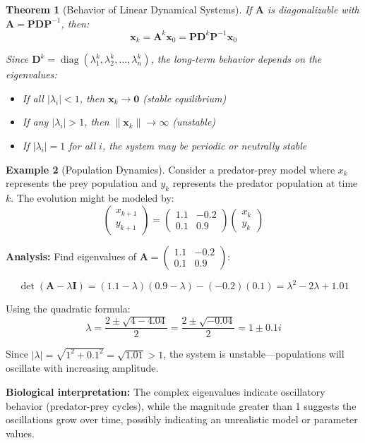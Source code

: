 \documentclass[12pt]{article}
\numberwithin{equation}{section}
\newcommand{\vect}[1]{\boldsymbol{#1}}   %
\newcommand{\mat}[1]{\mathbf{#1}}        %
\newcommand{\diag}{\operatorname{diag}}
\theoremstyle{plain}
\newtheorem{theorem}{Theorem}[section]
\theoremstyle{definition}
\newtheorem{example}[theorem]{Example}
\theoremstyle{remark}
\begin{document}
\begin{theorem}[Behavior of Linear Dynamical Systems]
If $\mat{A}$ is diagonalizable with $\mat{A} = \mat{P}\mat{D}\mat{P}^{-1}$, then:
$$\vect{x}_k = \mat{A}^k\vect{x}_0 = \mat{P}\mat{D}^k\mat{P}^{-1}\vect{x}_0$$

Since $\mat{D}^k = \diag(\lambda_1^k, \lambda_2^k, \ldots, \lambda_n^k)$, the long-term behavior depends on the eigenvalues:
\begin{itemize}
\item If all $|\lambda_i| < 1$, then $\vect{x}_k \to \vect{0}$ (stable equilibrium)
\item If any $|\lambda_i| > 1$, then $\|\vect{x}_k\| \to \infty$ (unstable)
\item If $|\lambda_i| = 1$ for all $i$, the system may be periodic or neutrally stable
\end{itemize}
\end{theorem}

\begin{example}[Population Dynamics]
Consider a predator-prey model where $x_k$ represents the prey population and $y_k$ represents the predator population at time $k$. The evolution might be modeled by:
$$\begin{pmatrix} x_{k+1} \\ y_{k+1} \end{pmatrix} = \begin{pmatrix} 1.1 & -0.2 \\ 0.1 & 0.9 \end{pmatrix}\begin{pmatrix} x_k \\ y_k \end{pmatrix}$$

\textbf{Analysis:} Find eigenvalues of $\mat{A} = \begin{pmatrix} 1.1 & -0.2 \\ 0.1 & 0.9 \end{pmatrix}$:

$$\det(\mat{A} - \lambda\mat{I}) = (1.1-\lambda)(0.9-\lambda) - (-0.2)(0.1) = \lambda^2 - 2\lambda + 1.01$$

Using the quadratic formula:
$$\lambda = \frac{2 \pm \sqrt{4 - 4.04}}{2} = \frac{2 \pm \sqrt{-0.04}}{2} = 1 \pm 0.1i$$

Since $|\lambda| = \sqrt{1^2 + 0.1^2} = \sqrt{1.01} > 1$, the system is unstable—populations will oscillate with increasing amplitude.

\textbf{Biological interpretation:} The complex eigenvalues indicate oscillatory behavior (predator-prey cycles), while the magnitude greater than 1 suggests the oscillations grow over time, possibly indicating an unrealistic model or parameter values.
\end{example}
\end{document}
